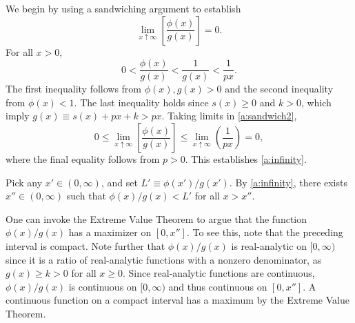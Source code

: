 \documentclass[12pt]{article}
\newcommand{\efficacy}{\phi}
\newcommand{\general}{g}
\begin{document}
We begin by using a sandwiching argument to establish 
\begin{equation}
\label{a:infinity}
\lim_{x \uparrow \infty} \left[ \frac{\efficacy(x)}{\general(x)}
  \right] = 0.
\end{equation}
For all $x > 0$, 
\begin{equation}
\label{a:sandwich2}
0 < \frac{\efficacy(x)}{\general(x)} < \frac{1}{\general(x)} <
\frac{1}{px}.
\end{equation}
The first inequality follows from $\efficacy(x), \general(x) > 0$ and
the second inequality from $\efficacy(x) < 1$. The last inequality
holds since $s(x) \geq 0$ and $k > 0$, which imply $g(x) \equiv s(x) +
px + k > px$. Taking limits in \eqref{a:sandwich2},
\begin{equation}
\label{a:sandwich_limits2}
0 \leq \lim_{x \uparrow \infty} \left[
  \frac{\efficacy(x)}{\general(x)} \right] \leq \lim_{x \uparrow
  \infty} \left( \frac{1}{px} \right) = 0,
\end{equation}
where the final equality follows from $p > 0$. This establishes
\eqref{a:infinity}.

Pick any $x' \in (0,\infty)$, and set $L' \equiv \efficacy(x') /
\general(x')$. By \eqref{a:infinity}, there exists $x'' \in
(0,\infty)$ such that $\efficacy(x) / \general(x) < L'$ for all $x >
x''$.

One can invoke the Extreme Value Theorem to argue that the function
$\efficacy(x) / \general(x)$ has a maximizer on $[0, x'']$. To see
this, note that the preceding interval is compact. Note further that
$\efficacy(x) / \general(x)$ is real-analytic on $[0, \infty)$ since
  it is a ratio of real-analytic functions with a nonzero denominator,
  as $g(x) \geq k > 0$ for all $x \geq 0$. Since real-analytic
  functions are continuous, $\efficacy(x) / \general(x)$ is continuous
  on $[0,\infty)$ and thus continuous on $[0, x'']$. A continuous
    function on a compact interval has a maximum by the Extreme Value
    Theorem.
\end{document}
